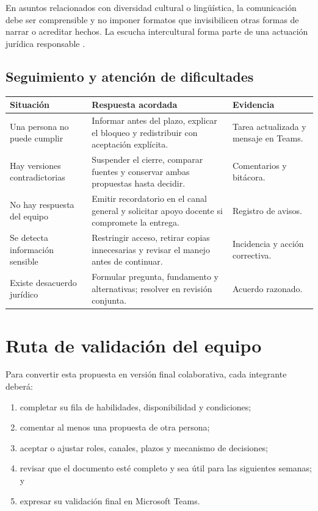 \documentclass[
  spanish,
  letterpaper, oneside
]{article}
\begin{document}
En asuntos relacionados con diversidad cultural o lingüística, la comunicación debe
ser comprensible y no imponer formatos que invisibilicen otras formas de narrar o
acreditar hechos. La escucha intercultural forma parte de una actuación jurídica
responsable \citep{pech2016manual,scjn2022protocolo}.

\subsection{Seguimiento y atención de dificultades}

\begin{tabularx}{\textwidth}{p{4cm}X p{3cm}}
\toprule
\textbf{Situación} & \textbf{Respuesta acordada} & \textbf{Evidencia} \\
\midrule
Una persona no puede cumplir & Informar antes del plazo, explicar el bloqueo y redistribuir con aceptación explícita. & Tarea actualizada y mensaje en Teams. \\
Hay versiones contradictorias & Suspender el cierre, comparar fuentes y conservar ambas propuestas hasta decidir. & Comentarios y bitácora. \\
No hay respuesta del equipo & Emitir recordatorio en el canal general y solicitar apoyo docente si compromete la entrega. & Registro de avisos. \\
Se detecta información sensible & Restringir acceso, retirar copias innecesarias y revisar el manejo antes de continuar. & Incidencia y acción correctiva. \\
Existe desacuerdo jurídico & Formular pregunta, fundamento y alternativas; resolver en revisión conjunta. & Acuerdo razonado. \\
\bottomrule
\end{tabularx}

\section{Ruta de validación del equipo}

Para convertir esta propuesta en versión final colaborativa, cada integrante deberá:

\begin{enumerate}
  \item completar su fila de habilidades, disponibilidad y condiciones;
  \item comentar al menos una propuesta de otra persona;
  \item aceptar o ajustar roles, canales, plazos y mecanismo de decisiones;
  \item revisar que el documento esté completo y sea útil para las siguientes semanas; y
  \item expresar su validación final en Microsoft Teams.
\end{enumerate}
\end{document}
